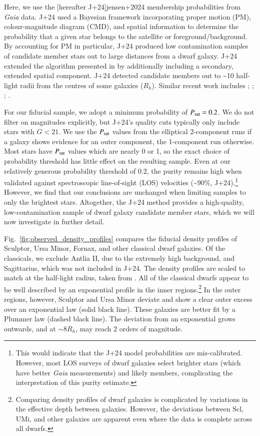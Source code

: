 \documentclass{aa}
\makeatletter
\DeclareRobustCommand\citepos
  {\begingroup
   \let\NAT@nmfmt\NAT@posfmt%
   \NAT@swafalse\let\NAT@ctype\z@\NAT@partrue
   \@ifstar{\NAT@fulltrue\NAT@citetp}{\NAT@fullfalse\NAT@citetp}}
\let\NAT@orig@nmfmt\NAT@nmfmt
\def\NAT@posfmt#1{\NAT@orig@nmfmt{#1's}}
\makeatother
\begin{document}
Here, we use the \citepos[hereafter J+24]{jensen+2024} membership
probabilities from \emph{Gaia} data. J+24 used a Bayesian framework
incorporating proper motion (PM), colour-magnitude diagram (CMD), and
spatial information to determine the probability that a given star
belongs to the satellite or foreground/background. By accounting for PM
in particular, J+24 produced low contamination samples of candidate
member stars out to large distances from a dwarf galaxy. J+24 extended
the algorithm presented in \citet{MV2020a, MV2020b} by additionally
including a secondary, extended spatial component. J+24 detected
candidate members out to \textasciitilde10 half-light radii from the
centres of some galaxies (\(R_h\)). Similar recent work includes
\citet{pace+li2019}; \citet{battaglia+2022}; \citet{pace+erkal+li2022};
\citet{qi+2022}.


For our fiducial sample, we adopt a minimum probability of
\(P_{\rm sat} = 0.2\). We do not filter on magnitudes explicitly, but
J+24's quality cuts typically only include stars with \(G < 21\). We use
the \(P_{\rm sat}\) values from the elliptical 2-component runs if a
galaxy shows evidence for an outer component, the 1-component run
otherwise. Most stars have \(P_{\rm  sat}\) values which are nearly 0 or
1, so the exact choice of probability threshold has little effect on the
resulting sample. Even at our relatively generous probability threshold
of 0.2, the purity remains high when validated against spectroscopic
line-of-sight (LOS) velocities (\textasciitilde90\%, J+24).\footnote{This
  would indicate that the J+24 model probabilities are mis-calibrated.
  However, most LOS surveys of dwarf galaxies select brighter stars
  (which have better \emph{Gaia} measurements) and likely members,
  complicating the interpretation of this purity estimate.} However, we
find that our conclusions are unchanged when limiting samples to only
the brightest stars. Altogether, the J+24 method provides a
high-quality, low-contamination sample of dwarf galaxy candidate member
stars, which we will now investigate in further detail.


Fig.~\ref{fig:observed_density_profiles} compares the fiducial density
profiles of Sculptor, Ursa Minor, Fornax, and other classical dwarf
galaxies. Of the classicals, we exclude Antlia II, due to the extremely
high background, and Sagittarius, which was not included in J+24. The
density profiles are scaled to match at the half-light radius, taken
from \citet{munoz+2018}. All of the classical dwarfs appear to be well
described by an exponential profile in the inner regions.\footnote{Comparing
  density profiles of dwarf galaxies is complicated by variations in the
  effective depth between galaxies. However, the deviations between Scl,
  UMi, and other galaxies are apparent even where the data is complete
  across all dwarfs.} In the outer regions, however, Sculptor and Ursa
Minor deviate and show a clear outer excess over an exponential law
(solid black line). These galaxies are better fit by a Plummer law
(dashed black line). The deviation from an exponential grows outwards,
and at \(\sim 8 R_h\), may reach 2 orders of magnitude. 
\end{document}
